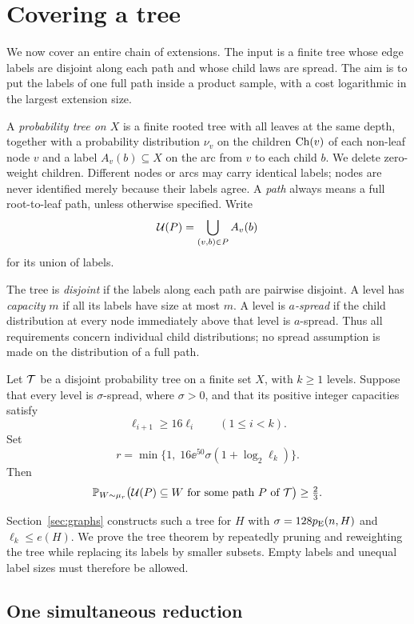 \section{Covering a tree}\label{sec:trees}

We now cover an entire chain of extensions. The input is a finite tree
whose edge labels are disjoint along each path and whose child laws are
spread. The aim is to put the labels of one full path inside a product
sample, with a cost logarithmic in the largest extension size.

A \emph{probability tree on $X$} is a finite rooted tree with all
leaves at the same depth, together with a probability distribution
$\nu_v$ on the children $\operatorname{Ch}(v)$ of each non-leaf node $v$ and a label
$A_v(b)\subseteq X$ on the arc from $v$ to each child $b$.
We delete zero-weight children. Different nodes or arcs may carry
identical labels; nodes are never identified merely because their
labels agree. A \emph{path} always means a full root-to-leaf path,
unless otherwise specified. Write
\[
 \mathcal U(P)=\bigcup_{(v,b)\in P}A_v(b)
\]
for its union of labels.

The tree is \emph{disjoint} if the labels along each path are pairwise
disjoint. A level has \emph{capacity} $m$ if all its labels have size
at most $m$. A level is \emph{$a$-spread} if the child distribution
at every node immediately above that level is $a$-spread.
Thus all requirements concern individual child distributions;
no spread assumption is made on the distribution of a full path.

\begin{theorem}\label{thm:tree}
Let $\mathcal T$ be a disjoint probability tree on a finite set $X$,
with $k\ge1$ levels. Suppose that every level is $\sigma$-spread,
where $\sigma>0$, and that its positive integer capacities satisfy
\[
 \ell_{i+1}\ge16\ell_i\qquad(1\le i<k).
\]
Set
\[
 r=\min\{1,\;16\ee^{50}\sigma(1+\log_2\ell_k)\}.
\]
Then
\[
 \mathbb P_{W\sim\mu_r}
 \bigl(\mathcal U(P)\subseteq W\text{ for some path }P\text{ of }\mathcal T\bigr)
 \ge\tfrac23.
\]
\end{theorem}

Section~\ref{sec:graphs} constructs such a tree for $H$ with
$\sigma=128p_{\mathrm E}(n,H)$ and $\ell_k\le e(H)$. We prove the tree theorem
by repeatedly pruning and reweighting the tree while replacing its
labels by smaller subsets. Empty labels and unequal label sizes
must therefore be allowed.

\subsection{One simultaneous reduction}

